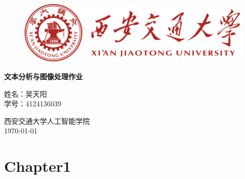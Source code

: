 \documentclass[12pt, a4paper, oneside]{ctexart}
\numberwithin{equation}{section}  %
\begin{document}
\begin{titlepage}
\begin{figure}[htbp]
  \centering
  \includegraphics[width=0.8\linewidth]{红色校徽文字.png}
\end{figure}
\centering\bfseries{} 文本分析与图像处理作业\\[5ex]
{
  \begin{center}
    姓名：吴天阳\\
    学号：4124136039\\
  \end{center}
}
{
  \vfill
  \begin{center}
  西安交通大学\quad 人工智能学院\\[2ex]
  \today %
  \end{center}
}
\end{titlepage}
\clearpage
\tableofcontents %
\clearpage

\section{Chapter1}
\end{document}
